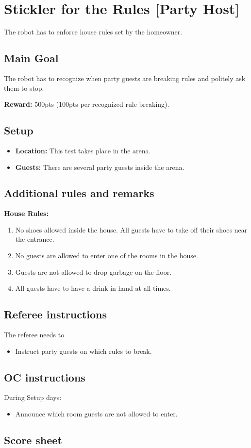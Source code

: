 \section{Stickler for the Rules [Party Host]}
The robot has to enforce house rules set by the homeowner.


\subsection{Main Goal}
The robot has to recognize when party guests are breaking rules and politely ask them to stop.

\noindent\textbf{Reward:} 500pts (100pts per recognized rule breaking).

\subsection{Setup}
\begin{itemize}[nosep]
	\item \textbf{Location:} This test takes place in the arena.
	\item \textbf{Guests:} There are several party guests inside the arena.
\end{itemize}


\subsection{Additional rules and remarks}
\textbf{House Rules:}
\begin{enumerate}[nosep]
	\item No shoes allowed inside the house. All guests have to take off their shoes near the entrance.
	\item No guests are allowed to enter one of the rooms in the house.
	\item Guests are not allowed to drop garbage on the floor.
	\item All guests have to have a drink in hand at all times.
\end{enumerate}

\subsection{Referee instructions}

The referee needs to
\begin{itemize}
	\item Instruct party guests on which rules to break.
\end{itemize}

\subsection{OC instructions}
During Setup days:
\begin{itemize}
	\item Announce which room guests are not allowed to enter.
\end{itemize}

\newpage
\subsection{Score sheet}



